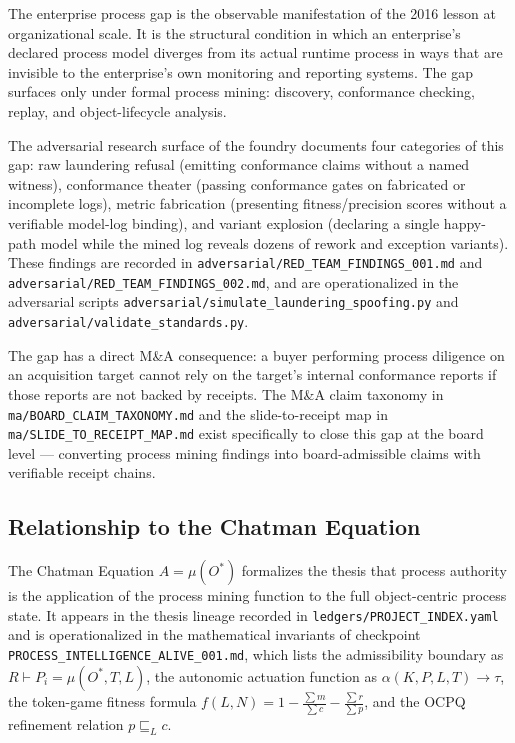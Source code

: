 The enterprise process gap is the observable manifestation of the 2016 lesson at organizational
scale. It is the structural condition in which an enterprise's declared process model diverges
from its actual runtime process in ways that are invisible to the enterprise's own monitoring
and reporting systems. The gap surfaces only under formal process mining: discovery, conformance
checking, replay, and object-lifecycle analysis.

The adversarial research surface of the foundry documents four categories of this gap:
raw laundering refusal (emitting conformance claims without a named witness),
conformance theater (passing conformance gates on fabricated or incomplete logs),
metric fabrication (presenting fitness/precision scores without a verifiable model-log binding),
and variant explosion (declaring a single happy-path model while the mined log reveals
dozens of rework and exception variants). These findings are recorded in
\texttt{adversarial/RED\_TEAM\_FINDINGS\_001.md} and
\texttt{adversarial/RED\_TEAM\_FINDINGS\_002.md}, and are operationalized in the
adversarial scripts
\texttt{adversarial/simulate\_laundering\_spoofing.py} and
\texttt{adversarial/validate\_standards.py}.

The gap has a direct M\&A consequence: a buyer performing process diligence on an acquisition
target cannot rely on the target's internal conformance reports if those reports are not backed
by receipts. The M\&A claim taxonomy in \texttt{ma/BOARD\_CLAIM\_TAXONOMY.md} and the
slide-to-receipt map in \texttt{ma/SLIDE\_TO\_RECEIPT\_MAP.md} exist specifically to close this
gap at the board level --- converting process mining findings into board-admissible claims with
verifiable receipt chains.

\subsection{Relationship to the Chatman Equation}
\label{sec:phd-thesis-lineage-equation}

The Chatman Equation $A = \mu(O^*)$ formalizes the thesis that process authority is the
application of the process mining function to the full object-centric process state. It appears
in the thesis lineage recorded in \texttt{ledgers/PROJECT\_INDEX.yaml} and is operationalized
in the mathematical invariants of checkpoint \texttt{PROCESS\_INTELLIGENCE\_ALIVE\_001.md},
which lists the admissibility boundary as $R \vdash P_i = \mu(O^*, T, L)$, the autonomic
actuation function as $\alpha(K, P, L, T) \to \tau$, the token-game fitness formula
$f(L, N) = 1 - \frac{\sum m}{\sum c} - \frac{\sum r}{\sum p}$, and the OCPQ refinement
relation $p \sqsubseteq_L c$.

